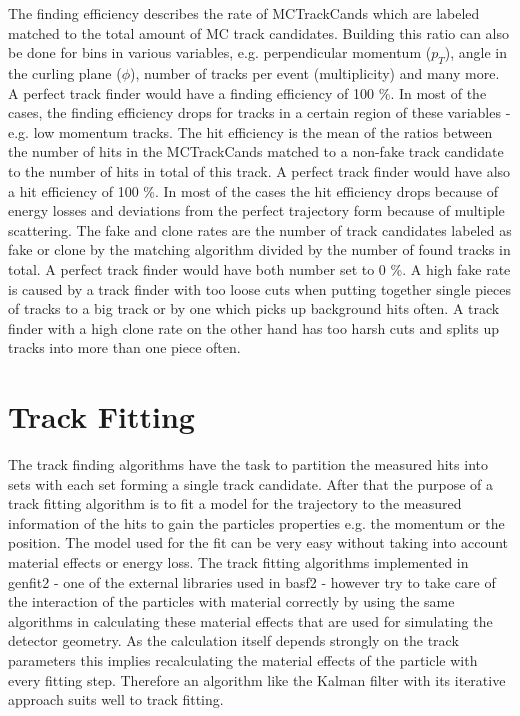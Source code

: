 The finding efficiency describes the rate of MCTrackCands which are labeled matched to the total amount of MC track candidates. Building this ratio can also be done for bins in various variables, e.g. perpendicular momentum ($p_T$), angle in the curling plane ($\phi$), number of tracks per event (multiplicity) and many more. A perfect track finder would have a finding efficiency of 100 \%. In most of the cases, the finding efficiency drops for tracks in a certain region of these variables - e.g. low momentum tracks.
The hit efficiency is the mean of the ratios between the number of hits in the MCTrackCands matched to a non-fake track candidate to the number of hits in total of this track. A perfect track finder would have also a hit efficiency of 100 \%. In most of the cases the hit efficiency drops because of energy losses and deviations from the perfect trajectory form because of multiple scattering.
The fake and clone rates are the number of track candidates labeled as fake or clone by the matching algorithm divided by the number of found tracks in total. A perfect track finder would have both number set to 0 \%. A high fake rate is caused by a track finder with too loose cuts when putting together single pieces of tracks to a big track or by one which picks up background hits often. A track finder with a high clone rate on the other hand has too harsh cuts and splits up tracks into more than one piece often.

\section{Track Fitting} \label{section-fitting}

The track finding algorithms have the task to partition the measured hits into sets with each set forming a single track candidate. After that the purpose of a track fitting algorithm is to fit a model for the trajectory to the measured information of the hits to gain the particles properties e.g. the momentum or the position. The model used for the fit can be very easy without taking into account material effects or energy loss. The track fitting algorithms implemented in genfit2 - one of the external libraries used in basf2 - however try to take care of the interaction of the particles with material correctly by using the same algorithms in calculating these material effects that are used for simulating the detector geometry. As the calculation itself depends strongly on the track parameters this implies recalculating the material effects of the particle with every fitting step. Therefore an algorithm like the Kalman filter with its iterative approach suits well to track fitting.

